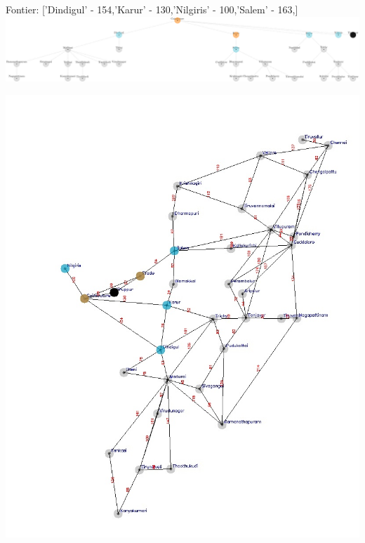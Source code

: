 \documentclass[xcolor=table]{beamer}
\begin{document}
\begin{frame}
  { \tiny Fontier: ['Dindigul' - 154,'Karur' - 130,'Nilgiris' - 100,'Salem' - 163,] }
  \includegraphics[width=1\textwidth]{../UCSNodes/6-1.png}
  \begin{center}
    \includegraphics[height=0.6\textheight]{../UCSoutput/tamilUCS4.jpg}
  \end{center}
\end{frame}
\end{document}

